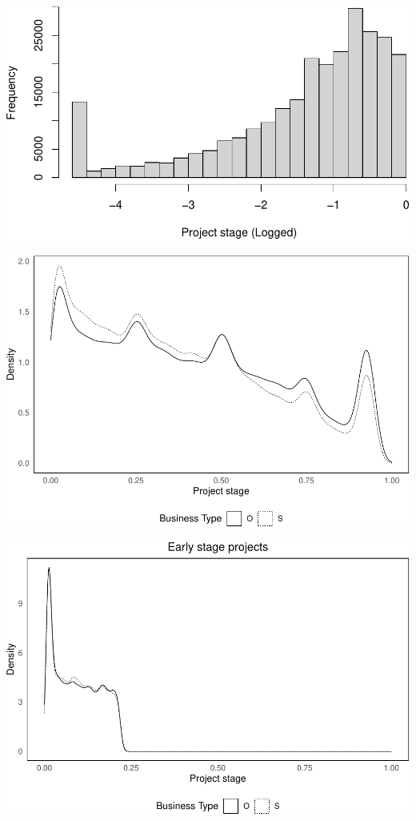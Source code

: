 \documentclass[
]{article}
\begin{document}
\includegraphics{qp_first_pc_delay-2_files/figure-latex/stage_plots_2-1.pdf}

\includegraphics{qp_first_pc_delay-2_files/figure-latex/stage_plots_3-1.pdf}

\includegraphics{qp_first_pc_delay-2_files/figure-latex/stage_plots_tercile_1-1.pdf}
\end{document}
